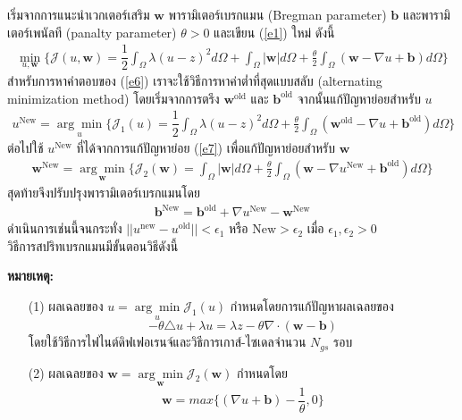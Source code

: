 \hspace{1cm} เริ่มจากการแนะนำเวกเตอร์เสริม $\boldsymbol{w}$ พารามิเตอร์เบรกแมน (Bregman parameter) $\boldsymbol{b}$ และพารามิเตอร์เพนัลที (panalty parameter) $\theta>0$ และเขียน (\ref{e1}) ใหม่ ดังนี้
\begin{align}
	\min_{u,\boldsymbol{w}} \{ \mathcal{J}(u,\boldsymbol{w}) = \dfrac{1}{2} \int_{\Omega} \lambda(u-z)^2 d\Omega +  \int_{\Omega}  | \boldsymbol{w}|  d\Omega + \frac{\theta}{2} \int_{\Omega} (\boldsymbol{w} - \nabla u + \boldsymbol{b}) d\Omega \}
	\label{e6}
\end{align}
\hspace{1cm}สำหรับการหาคำตอบของ (\ref{e6}) เราจะใช้วิธีการหาค่าต่ำที่สุดแบบสลับ (alternating minimization method) โดยเริ่มจากการตรึง $\boldsymbol{w}^{\text{old}}$ และ $\boldsymbol{b}^{\text{old}}$ จากนั้นแก้ปัญหาย่อยสำหรับ $u$
\begin{align}
	u^{\text{New}}=\underset{u}{\arg\min} \{ \mathcal{J}_1(u) = \dfrac{1}{2} \int_{\Omega} \lambda(u-z)^2 d\Omega + \frac{\theta}{2} \int_{\Omega} (\boldsymbol{w}^{\text{old}} - \nabla u + \boldsymbol{b}^{\text{old}}) d\Omega \}
	\label{e7}
\end{align}
ต่อไปใช้ $u^{\text{New}}$ ที่ได้จากการแก้ปัญหาย่อย (\ref{e7}) เพื่อแก้ปัญหาย่อยสำหรับ $\boldsymbol{w}$
\begin{align}
	\boldsymbol{w}^{\text{New}}=\underset{\boldsymbol{w}}{\arg\min} \{ \mathcal{J}_2(\boldsymbol{w}) = \int_{\Omega}  |\boldsymbol{w}|  d\Omega  + \frac{\theta}{2} \int_{\Omega} (\boldsymbol{w} - \nabla u^{\text{New}} + \boldsymbol{b}^{\text{old}}) d\Omega \}
	\label{e8}
\end{align}
	สุดท้ายจึงปรับปรุงพารามิเตอร์เบรกแมนโดย 
\begin{align}
	\boldsymbol{b}^{\text{New}}=\boldsymbol{b}^{\text{old}}+\nabla u^{\text{New}}-\boldsymbol{w}^{\text{New}}
	\label{e9}
\end{align}
ดำเนินการเช่นนี้จนกระทั่ง $||u^{\text{new}}-u^{\text{old}}||< \epsilon_1$ หรือ $\text{New}>\epsilon_2$ เมื่อ $\epsilon_1,\epsilon_2>0$ \\ 
\vspace{0.5cm}
\hspace{1cm}วิธีการสปริทเบรกแมนมีขั้นตอนวิธีดังนี้ \\
\vspace{0.5cm}

\vspace{0.5cm}
\textbf{หมายเหตุ:}
\begin{itemize}
	\item [(1)] ผลเฉลยของ $ u = \underset{u}{\arg\min} \mathcal{J}_1(u) $ กำหนดโดยการแก้ปัญหาผลเฉลยของ
	 $$ - \theta \triangle u + \lambda u = \lambda z - \theta \nabla \cdot (\boldsymbol{w}-\boldsymbol{b})$$ 
	 โดยใช้วิธีการไฟไนต์ดิฟเฟอเรนจ์และวิธีการเกาส์-ไซเดลจำนวน $N_{gs}$ รอบ
	\item [(2)] ผลเฉลยของ $ \boldsymbol{w} = \underset{\boldsymbol{w}}{\arg\min} \mathcal{J}_2(\boldsymbol{w}) $ กำหนดโดย $$\boldsymbol{w} = max\bigg\{(\nabla u + \boldsymbol{b}) - \frac{1}{\theta},0\bigg\}$$
\end{itemize}
